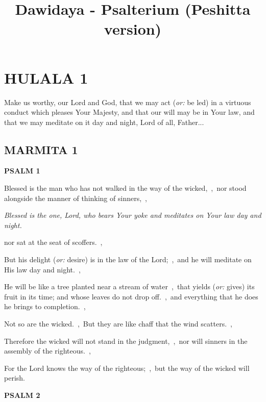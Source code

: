 \documentclass[12pt,twoside,a5paper]{article}
\newcommand{\hulala}[1]{\section*{HULALA {#1}}}
\newcommand{\marmita}[1]{\subsection*{MARMITA {#1}}}
\newcommand{\psalm}[1]{\textbf{PSALM {#1}}\nopagebreak}
\newcommand{\qanona}[1]{{\liturgicalhint{Qanona.} \emph{#1}}}
\newcommand{\slota}[1]{\liturgicalhint{Slota.} #1}
\newcommand{\translationoption}[1]{\emph{or:} #1}
\begin{document}
\title{Dawidaya - Psalterium (Peshitta version)}
\author{}
\date{}
\maketitle


\hulala{1}

\slota{Make us worthy, our Lord and God, that we may act (\translationoption{be led})  in a virtuous conduct which pleases Your Majesty, and that our will may be in Your law, and that we may meditate on it day and night, Lord of all, Father...}

\marmita{1}

\psalm{1}

\begin{normalparskip}
Blessed is the man who has not walked in the way of the wicked,~\sep\ nor stood alongside the manner of thinking of sinners,~\sep

\qanona{Blessed is the one, Lord, who bears Your yoke and meditates on Your law day and night.}

nor sat at the seat of scoffers.~\sep

But his delight (\translationoption{desire}) is in the law of the Lord;~\sep\ and he will meditate on His law day and night.~\sep

He will be like a tree planted near a stream of water~\sep\ that yields (\translationoption{gives}) its fruit in its time; and whose leaves do not drop off.~\sep\ and everything that he does he brings to completion.~\sep

Not so are the wicked.~\sep\ But they are like chaff that the wind scatters.~\sep

Therefore the wicked will not stand in the judgment,~\sep\ nor will sinners in the assembly of the righteous.~\sep

For the Lord knows the way of the righteous;~\sep\ but the way of the wicked will perish.
\end{normalparskip}

\psalm{2}
\end{document}
